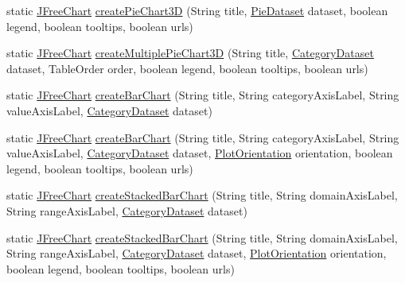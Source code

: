 \begin{DoxyCompactItemize}
\item 
static \mbox{\hyperlink{classorg_1_1jfree_1_1chart_1_1_j_free_chart}{J\+Free\+Chart}} \mbox{\hyperlink{classorg_1_1jfree_1_1chart_1_1_chart_factory_ab1426d49e5dea47c4761f6d897fecf03}{create\+Pie\+Chart3D}} (String title, \mbox{\hyperlink{interfaceorg_1_1jfree_1_1data_1_1general_1_1_pie_dataset}{Pie\+Dataset}} dataset, boolean legend, boolean tooltips, boolean urls)
\item 
static \mbox{\hyperlink{classorg_1_1jfree_1_1chart_1_1_j_free_chart}{J\+Free\+Chart}} \mbox{\hyperlink{classorg_1_1jfree_1_1chart_1_1_chart_factory_a4d05fab74874750bb94da2cfff6b4bdd}{create\+Multiple\+Pie\+Chart3D}} (String title, \mbox{\hyperlink{interfaceorg_1_1jfree_1_1data_1_1category_1_1_category_dataset}{Category\+Dataset}} dataset, Table\+Order order, boolean legend, boolean tooltips, boolean urls)
\item 
static \mbox{\hyperlink{classorg_1_1jfree_1_1chart_1_1_j_free_chart}{J\+Free\+Chart}} \mbox{\hyperlink{classorg_1_1jfree_1_1chart_1_1_chart_factory_a32cc35fb7811d962e52cd7e18136a445}{create\+Bar\+Chart}} (String title, String category\+Axis\+Label, String value\+Axis\+Label, \mbox{\hyperlink{interfaceorg_1_1jfree_1_1data_1_1category_1_1_category_dataset}{Category\+Dataset}} dataset)
\item 
static \mbox{\hyperlink{classorg_1_1jfree_1_1chart_1_1_j_free_chart}{J\+Free\+Chart}} \mbox{\hyperlink{classorg_1_1jfree_1_1chart_1_1_chart_factory_a4604fa577efa3da0c9ee1ad632ffd773}{create\+Bar\+Chart}} (String title, String category\+Axis\+Label, String value\+Axis\+Label, \mbox{\hyperlink{interfaceorg_1_1jfree_1_1data_1_1category_1_1_category_dataset}{Category\+Dataset}} dataset, \mbox{\hyperlink{classorg_1_1jfree_1_1chart_1_1plot_1_1_plot_orientation}{Plot\+Orientation}} orientation, boolean legend, boolean tooltips, boolean urls)
\item 
static \mbox{\hyperlink{classorg_1_1jfree_1_1chart_1_1_j_free_chart}{J\+Free\+Chart}} \mbox{\hyperlink{classorg_1_1jfree_1_1chart_1_1_chart_factory_aa42771c081fc3b3eda14b699496ef472}{create\+Stacked\+Bar\+Chart}} (String title, String domain\+Axis\+Label, String range\+Axis\+Label, \mbox{\hyperlink{interfaceorg_1_1jfree_1_1data_1_1category_1_1_category_dataset}{Category\+Dataset}} dataset)
\item 
static \mbox{\hyperlink{classorg_1_1jfree_1_1chart_1_1_j_free_chart}{J\+Free\+Chart}} \mbox{\hyperlink{classorg_1_1jfree_1_1chart_1_1_chart_factory_aac35485ae7bbf60ce2025d4a64abbb87}{create\+Stacked\+Bar\+Chart}} (String title, String domain\+Axis\+Label, String range\+Axis\+Label, \mbox{\hyperlink{interfaceorg_1_1jfree_1_1data_1_1category_1_1_category_dataset}{Category\+Dataset}} dataset, \mbox{\hyperlink{classorg_1_1jfree_1_1chart_1_1plot_1_1_plot_orientation}{Plot\+Orientation}} orientation, boolean legend, boolean tooltips, boolean urls)

\end{DoxyCompactItemize}
